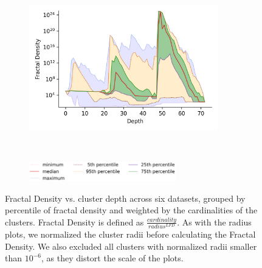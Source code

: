 \documentclass{article}
\begin{document}
\begin{figure}
\begin{subfigure}[b]{0.47\textwidth}
        \label{fig:supplement:silva-fractal_density}
    \end{subfigure}%
    \begin{subfigure}[b]{0.47\textwidth}
        \includegraphics[width=0.9\textwidth]{images/fractal_density/radio-ml.png}\\
        \label{fig:supplement:radioml-fractal_density}
    \end{subfigure}%
    \\
    \vskip 0.005in
    \begin{subfigure}[b]{0.94\textwidth}
        \centering
        \includegraphics[width=0.7\textwidth]{images/fractal_density/legend.png}
        \label{fig:supplement:fractal_density-legend}
    \end{subfigure}%
    \caption{Fractal Density vs. cluster depth across six datasets, grouped by percentile of fractal density and weighted by the cardinalities of the clusters.
    Fractal Density is defined as $\frac{cardinality}{radius^{LFD}}$.
    As with the radius plots, we normalized the cluster radii before calculating the Fractal Density.
    We also excluded all clusters with normalized radii smaller than $10^{-6}$, as they distort the scale of the plots.}
    \label{fig:supplement:fractal_density-plots}
\end{figure}




\end{document}

